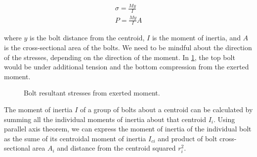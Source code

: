 \documentclass[
10pt,
a4paper,
openany,
svgnames,
]{book}
\begin{document}
\begin{align}
  \label{eq: bolted stress under bending}
  \sigma = \frac{My}{I} \\
  P = \frac{My}{I} A
\end{align}

where $y$ is the bolt distance from the centroid, $I$ is the moment of inertia, and $A$ is the cross-sectional area of the bolts. We need to be mindful about the direction of the stresses, depending on the direction of the moment. In \cref{fig: bolted joint under bending}, the top bolt would be under additional tension and the bottom compression from the exerted moment. 

\begin{figure}[H]
  \centering
  \caption{Bolt resultant stresses from exerted moment.}
  \label{fig: bolted joint under bending}
\end{figure}

The moment of inertia $I$ of a group of bolts about a centroid can be calculated by summing all the individual moments of inertia about that centroid $I_i$. Using parallel axis theorem, we can express the moment of inertia of the individual bolt as the sume of its centroidal moment of inertia $I_{ci}$ and product of bolt cross-sectional area $A_i$ and distance from the centroid squared $r_i^2$.
\end{document}
